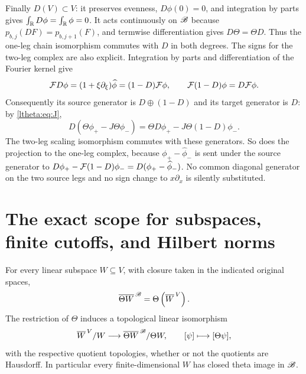 Finally $D(V)\subset V$: it preserves evenness, $D\phi(0)=0$, and
integration by parts gives $\int_\mathbb R D\phi=\int_\mathbb R\phi=0$.
It acts continuously on $\mathscr B$ because $p_{b,j}(DF)=p_{b,j+1}(F)$,
and termwise differentiation gives $D\Theta=\Theta D$. Thus the
one-leg chain isomorphism commutes with $D$ in both degrees.
The signs for the two-leg complex are also explicit. Integration by
parts and differentiation of the Fourier kernel give
\[
 \mathcal F D\phi=(1+\xi\partial_\xi)\widehat\phi
           =(1-D)\mathcal F\phi,
 \qquad \mathcal F(1-D)\phi=D\mathcal F\phi.
\]
Consequently its source generator is $D\oplus(1-D)$ and its target
generator is $D$: by \eqref{ltheta:eq:J},
\[
 D(\Theta\phi_+-J\Theta\phi_-)
    =\Theta D\phi_+-J\Theta(1-D)\phi_-.
\]
The two-leg scaling isomorphism commutes with these generators.
So does the projection to the one-leg complex, because
$\phi_+-\widehat\phi_-$ is sent under the source generator to
$D\phi_+-\mathcal F(1-D)\phi_-=D(\phi_+-\widehat\phi_-)$.
No common diagonal generator on the two source legs and no sign
change to $x\partial_x$ is silently substituted.

\section{The exact scope for subspaces, finite cutoffs, and Hilbert norms}

\begin{lthetaproposition}\label{ltheta:prop:subspace}
For every linear subspace $W\subseteq V$, with closure taken in the
indicated original spaces,
\begin{equation}\label{ltheta:eq:W}
 \overline{\Theta W}^{\,\mathscr B}
       =\Theta\left(\overline W^{\,V}\right).
\end{equation}
The restriction of $\Theta$ induces a topological linear isomorphism
\[
 \overline W^{\,V}/W
       \longrightarrow\overline{\Theta W}^{\,\mathscr B}/\Theta W,
 \qquad[\psi]\longmapsto[\Theta\psi],
\]
with the respective quotient topologies, whether or not the quotients
are Hausdorff. In particular every finite-dimensional $W$ has closed
theta image in $\mathscr B$.
\end{lthetaproposition}

